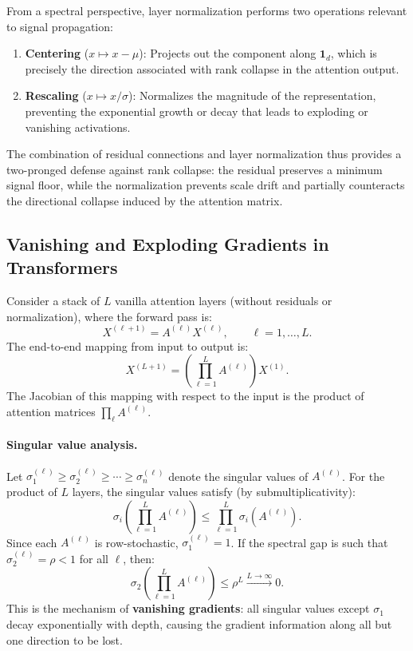 \documentclass[12pt, a4paper]{article}
\begin{document}
From a spectral perspective, layer normalization performs two operations
relevant to signal propagation:
\begin{enumerate}[label=(\roman*)]
    \item \textbf{Centering} ($x \mapsto x - \mu$): Projects out the
          component along $\mathbf{1}_d$, which is precisely the
          direction associated with rank collapse in the attention
          output.
    \item \textbf{Rescaling} ($x \mapsto x / \sigma$): Normalizes the
          magnitude of the representation, preventing the exponential
          growth or decay that leads to exploding or vanishing
          activations.
\end{enumerate}
The combination of residual connections and layer normalization thus
provides a two-pronged defense against rank collapse: the residual
preserves a minimum signal floor, while the normalization prevents
scale drift and partially counteracts the directional collapse induced
by the attention matrix.

\subsection{Vanishing and Exploding Gradients in Transformers}

Consider a stack of $L$ vanilla attention layers (without residuals or
normalization), where the forward pass is:
\begin{equation}
    X^{(\ell+1)} = A^{(\ell)} X^{(\ell)}, \qquad \ell = 1, \ldots, L.
    \label{eq:vanilla_forward}
\end{equation}
The end-to-end mapping from input to output is:
\begin{equation}
    X^{(L+1)} = \left(\prod_{\ell=1}^{L} A^{(\ell)}\right) X^{(1)}.
    \label{eq:product}
\end{equation}
The Jacobian of this mapping with respect to the input is the product
of attention matrices $\prod_{\ell} A^{(\ell)}$.

\paragraph{Singular value analysis.}
Let $\sigma_1^{(\ell)} \geq \sigma_2^{(\ell)} \geq \cdots \geq
\sigma_n^{(\ell)}$ denote the singular values of $A^{(\ell)}$. For the
product of $L$ layers, the singular values satisfy (by submultiplicativity):
\begin{equation}
    \sigma_i\!\left(\prod_{\ell=1}^{L} A^{(\ell)}\right) \leq
    \prod_{\ell=1}^{L} \sigma_i\!\left(A^{(\ell)}\right).
    \label{eq:sv_bound}
\end{equation}
Since each $A^{(\ell)}$ is row-stochastic, $\sigma_1^{(\ell)} = 1$. If
the spectral gap is such that $\sigma_2^{(\ell)} = \rho < 1$ for all
$\ell$, then:
\begin{equation}
    \sigma_2\!\left(\prod_{\ell=1}^{L} A^{(\ell)}\right)
    \leq \rho^L \xrightarrow{L \to \infty} 0.
    \label{eq:vanishing}
\end{equation}
This is the mechanism of \textbf{vanishing gradients}: all singular
values except $\sigma_1$ decay exponentially with depth, causing the
gradient information along all but one direction to be lost.
\end{document}
